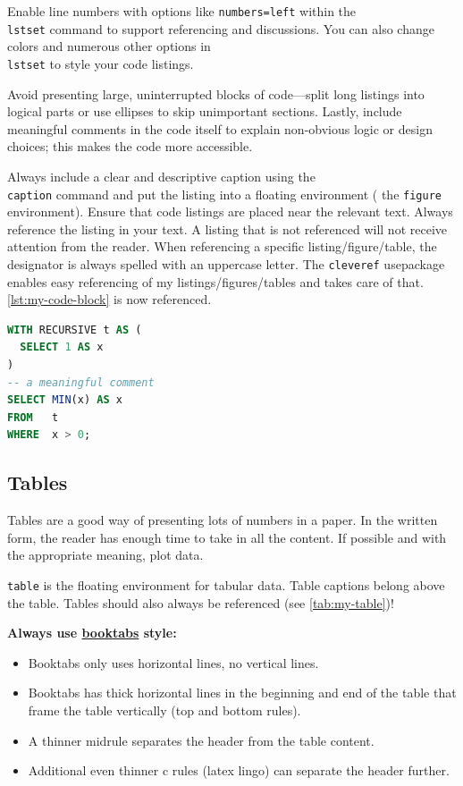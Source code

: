 \documentclass[sigconf,nonacm,screen]{acmart}
\begin{document}
Enable line numbers with options like \texttt{numbers=left} within the \texttt{\\lstset} command to support referencing and discussions. You can also change colors and numerous other options in \texttt{\\lstset} to style your code listings.

Avoid presenting large, uninterrupted blocks of code---split long listings into logical parts or use ellipses to skip unimportant sections. Lastly, include meaningful comments in the code itself to explain non-obvious logic or design choices; this makes the code more accessible. 

Always include a clear and descriptive caption using the \texttt{\\caption{}} command and put the listing into a floating environment (\eg{} the \texttt{figure} environment). Ensure that code listings are placed near the relevant text. Always reference the listing in your text. A listing that is not referenced will not receive attention from the reader. When referencing a specific listing/figure/table, the designator is always spelled with an uppercase letter. The \texttt{cleveref} usepackage enables easy referencing of my listings/figures/tables and takes care of that. \cref{lst:my-code-block} is now referenced. 

\begin{lstfloat}[b]
    \begin{lstlisting}[language=sql]
WITH RECURSIVE t AS (
  SELECT 1 AS x
)
-- a meaningful comment
SELECT MIN(x) AS x
FROM   t
WHERE  x > 0;
\end{lstlisting}
    \caption{A code listing.}
    \label{lst:my-code-block}
\end{lstfloat}

\subsection{Tables}
Tables are a good way of presenting lots of numbers in a paper. In the written form, the reader has enough time to take in all the content. If possible and with the appropriate meaning, plot data.

\texttt{table} is the floating environment for tabular data. Table captions belong above the table. Tables should also always be referenced (see \cref{tab:my-table})!

\textbf{Always use \href{https://nhigham.com/2019/11/19/better-latex-tables-with-booktabs/}{booktabs} style:}
\begin{itemize}
    \item Booktabs only uses horizontal lines, no vertical lines.
    \item Booktabs has thick horizontal lines in the beginning and end of the table that frame the table vertically (top and bottom rules).
    \item A thinner midrule separates the header from the table content.
    \item Additional even thinner c rules (latex lingo) can separate the header further.
\end{itemize}
\end{document}
